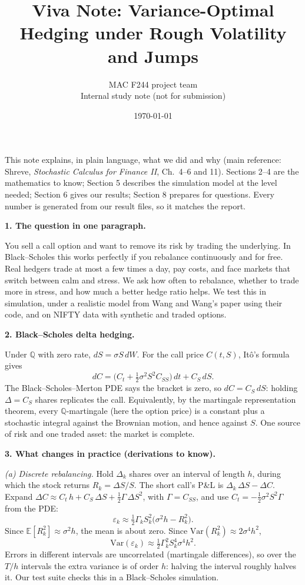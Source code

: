 \documentclass[10pt,leqno]{amsart}
\newcommand{\heading}[1]{\medskip\noindent\textbf{#1}\par}
\begin{document}
\title{Viva Note: Variance-Optimal Hedging under Rough Volatility and Jumps}
\author{MAC F244 project team \\ Internal study note (not for submission)}
\date{\today}
\maketitle
\vspace{-1em}

\noindent This note explains, in plain language, what we did and why (main
reference: Shreve, \emph{Stochastic Calculus for Finance II}, Ch.~4--6 and 11).
Sections 2--4 are the mathematics to know; Section 5
describes the simulation model at the level needed; Section 6 gives our
results; Section 8 prepares for questions. Every number is generated from our
result files, so it matches the report.

\heading{1. The question in one paragraph.}
\noindent You sell a call option and want to remove its risk by trading the
underlying. In Black--Scholes this works perfectly if you rebalance
continuously and for free. Real hedgers trade at most a few times a day, pay
costs, and face markets that switch between calm and stress. We ask how often
to rebalance, whether to trade more in stress, and how much a better hedge
ratio helps. We test this in simulation, under a realistic model from Wang and
Wang's paper using their code, and on NIFTY data with synthetic and traded
options.

\heading{2. Black--Scholes delta hedging.}
\noindent Under $\mathbb{Q}$ with zero rate, $dS=\sigma S\,dW$. For the call price
$C(t,S)$, It\^o's formula gives
\[
dC=\big(C_t+\tfrac12\sigma^2S^2C_{SS}\big)\,dt+C_S\,dS .
\]
The Black--Scholes--Merton PDE says the bracket is zero, so $dC=C_S\,dS$:
holding $\Delta=C_S$ shares replicates the call. Equivalently, by the
martingale representation theorem, every $\mathbb{Q}$-martingale (here the
option price) is a constant plus a stochastic integral against the Brownian
motion, and hence against $S$. One source of risk and one traded asset: the market is complete.

\heading{3. What changes in practice (derivations to know).}
\noindent\emph{(a) Discrete rebalancing.} Hold $\Delta_k$ shares over an interval
of length $h$, during which the stock returns $R_k=\Delta S/S$. The short call's
P\&L is $\Delta_k\,\Delta S-\Delta C$. Expand
$\Delta C\approx C_t\,h+C_S\,\Delta S+\frac12\Gamma\,\Delta S^2$, with
$\Gamma=C_{SS}$, and use $C_t=-\frac12\sigma^2S^2\Gamma$ from the PDE:
\[
\varepsilon_k\approx\tfrac12\Gamma_kS_k^2\big(\sigma^2h-R_k^2\big).
\]
Since $\mathbb{E}[R_k^2]\approx\sigma^2h$, the mean is about zero. Since
$\mathrm{Var}(R_k^2)\approx2\sigma^4h^2$,
\[
\mathrm{Var}(\varepsilon_k)\approx\tfrac12\Gamma_k^2S_k^4\sigma^4h^2 .
\]
Errors in different intervals are uncorrelated (martingale differences), so
over the $T/h$ intervals the extra variance is of order $h$: halving the
interval roughly halves it. Our test suite checks this in a Black--Scholes
simulation.
\end{document}
